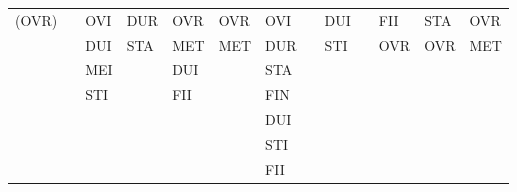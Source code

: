 \documentclass[11pt]{report}
\newenvironment{vvarmargin}[2]
{
  \begin{list}{}
  {
    \setlength{\topsep}{0pt}
    \setlength{\leftmargin}{0pt}
    \setlength{\rightmargin}{0pt}
    \setlength{\listparindent}{\parindent}
    \setlength{\itemindent}{\parindent}
    \setlength{\parsep}{0pt plus 1pt}
    \addtolength{\leftmargin}{#1}\addtolength{\rightmargin}{#2}
  }
  \item
}
{
  \end{list}
}
\begin{document}
\begin{table}[p]
\begin{vvarmargin}{-4cm}{-4cm}
\begin{center}
\begin{tabular}[t]{|r|l|l|l|l|l|l|l|l|l|l|l|l|}
                  (OVR)                   &                         & OVI                     & DUR                     & OVR                     & OVR                     & OVI                     &                         & DUI                     &                         & FII                     & STA                     & OVR                     \\
                                          &                         & DUI                     & STA                     & MET                     & MET                     & DUR                     &                         & STI                     &                         & OVR                     & OVR                     & MET                     \\
                                          &                         & MEI                     &                         & DUI                     &                         & STA                     &                         &                         &                         &                         &                         &                         \\
                                          &                         & STI                     &                         & FII                     &                         & FIN                     &                         &                         &                         &                         &                         &                         \\
                                          &                         &                         &                         &                         &                         & DUI                     &                         &                         &                         &                         &                         &                         \\
                                          &                         &                         &                         &                         &                         & STI                     &                         &                         &                         &                         &                         &                         \\
                                          &                         &                         &                         &                         &                         & FII                     &                         &                         &                         &                         &                         &                         \\

\end{tabular}
\end{center}
\end{vvarmargin}
\end{table}
\end{document}

